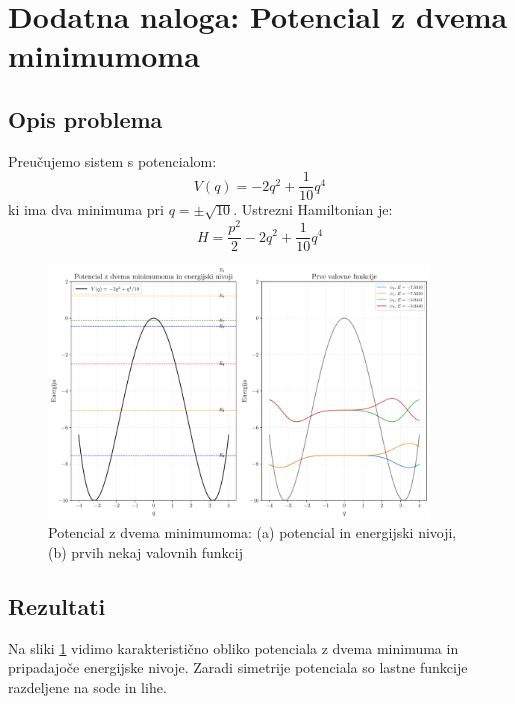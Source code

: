 \documentclass[12pt,a4paper]{article}
\begin{document}
\newpage

\section{Dodatna naloga: Potencial z dvema minimumoma}

\subsection{Opis problema}
Preučujemo sistem s potencialom:
\[
V(q) = -2q^2 + \frac{1}{10}q^4
\]
ki ima dva minimuma pri $q = \pm\sqrt{10}$. Ustrezni Hamiltonian je:
\[
H = \frac{p^2}{2} - 2q^2 + \frac{1}{10}q^4
\]

\begin{figure}[hb]
    \centering
    \includegraphics[width=0.9\textwidth]{anharmonic_oscillator_plots/05_potencial_dva_minimuma.pdf}
    \caption{Potencial z dvema minimumoma: (a) potencial in energijski nivoji, (b) prvih nekaj valovnih funkcij}
    \label{fig:potencial_dva_minimuma}
\end{figure}

\newpage

\subsection{Rezultati}
Na sliki \ref{fig:potencial_dva_minimuma} vidimo karakteristično obliko potenciala z dvema minimuma in 
pripadajoče energijske nivoje. Zaradi simetrije potenciala so lastne funkcije razdeljene na sode in lihe.
\end{document}
